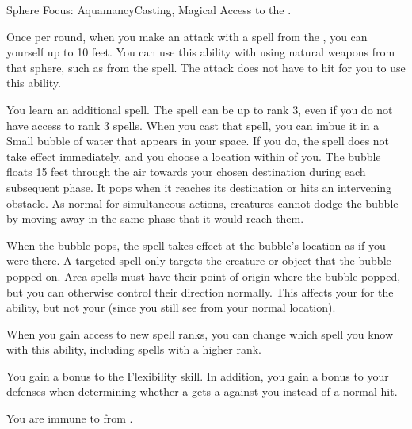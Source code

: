     \begin{magicalfeat}{Sphere Focus: Aquamancy}{Casting, Magical}
        \featpre Access to the  .

         Once per round, when you make an attack with a spell from the  , you can  yourself up to 10 feet.
        You can use this ability with  using natural weapons from that sphere, such as from the  spell.
        The attack does not have to hit for you to use this ability.

         You learn an additional spell.
        The spell can be up to rank 3, even if you do not have access to rank 3 spells.
        When you cast that spell, you can imbue it in a Small bubble of water that appears in your space.
        If you do, the spell does not take effect immediately, and you choose a location within \medrange of you.
        The bubble floats 15 feet through the air towards your chosen destination during each subsequent phase.
        It pops when it reaches its destination or hits an intervening obstacle.
        As normal for simultaneous actions, creatures cannot dodge the bubble by moving away in the same phase that it would reach them.

        When the bubble pops, the spell takes effect at the bubble's location as if you were there.
        A targeted spell only targets the creature or object that the bubble popped on.
        Area spells must have their point of origin where the bubble popped, but you can otherwise control their direction normally.
        This affects your  for the ability, but not your  (since you still see from your normal location).

        When you gain access to new spell ranks, you can change which spell you know with this ability, including spells with a higher rank.

         You gain a  bonus to the Flexibility skill.
        In addition, you gain a  bonus to your defenses when determining whether a  gets a  against you instead of a normal hit.

         You are immune to  from .
    \end{magicalfeat}

